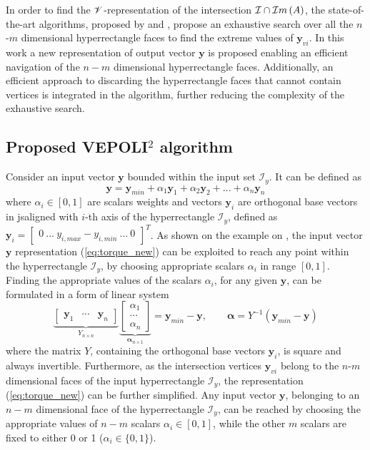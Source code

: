 In order to find the  $\mathscr{V}$-representation of the intersection  $\mathcal{I}\cap \mathcal{I}m\left(A\right)$, the state-of-the-art algorithms, proposed by \citet{chiacchio_evaluation_1996} and \citet{sasaki2011vertex}, propose an exhaustive search over all the $n$-$m$ dimensional hyperrectangle faces to find the extreme values of $\bm{y}_{vi}$. In this work a new representation of output vector $\bm{y}$ is proposed enabling an efficient navigation of the $n-m$ dimensional hyperrectangle faces. Additionally, an efficient approach to discarding the hyperrectangle faces that cannot contain vertices is integrated in the algorithm, further reducing the complexity of the exhaustive search.

\subsection{Proposed VEPOLI$^2$ algorithm}
Consider an input vector $\bm{y}$ bounded within the input set $\mathcal{I}_y$. It can be defined as
\begin{equation}
    \bm{y} = {\bm{y}}_{min} + \alpha_1 \bm{y}_1+ \alpha_2 \bm{y}_2 + ... + \alpha_n \bm{y}_n
    \label{eq:torque_new}
\end{equation}
where $\alpha_i \in [0,1]$ are scalars weights and vectors $\bm{y}_i$ are orthogonal base vectors in \gls{js}aligned with $i$-th axis of the hyperrectangle $\mathcal{I}_y$, defined as $\bm{y}_i = \begin{bmatrix} 0~\ldots~y_{i,max} - y_{i,min}~\ldots~0 \end{bmatrix}^T$. As shown on the example on , the input vector $\bm{y}$ representation (\ref{eq:torque_new}) can be exploited to reach any point within the hyperrectangle $\mathcal{I}_y$, by choosing appropriate scalars $\alpha_i$ in range $[0,1]$. Finding the appropriate values of the scalars $\alpha_i$, for any given $\bm{y}$, can be formulated in a form of linear system
\begin{equation}
\underbrace{\begin{bmatrix}
    \bm{y}_1&\cdots&\bm{y}_n
\end{bmatrix}}_{Y_{n\times n}}\underbrace{\begin{bmatrix}
    \alpha_1\\
    \cdots\\
    \alpha_n
\end{bmatrix}}_{\bm{\alpha}_{n\times 1}} = \bm{y}_{min} - \bm{y}, \qquad  \bm{\alpha} = Y^{-1}(\bm{y}_{min} - \bm{y})
\label{eq:define_Y_Alpha}
\end{equation}
where the matrix $Y$, containing the orthogonal base vectors $\bm{y}_i$, is square and always invertible. 
Furthermore, as the intersection vertices $\bm{y}_{vi}$ belong to the $n$-$m$ dimensional faces of the input hyperrectangle $\mathcal{I}_y$, the representation (\ref{eq:torque_new}) can be further simplified. Any input vector $\bm{y}$, belonging to an $n-m$ dimensional face of the hyperrectangle $\mathcal{I}_y$, can be reached by choosing the appropriate values of $n-m$ scalars $\alpha_i\in[0,1]$, while the other $m$ scalars are fixed to either 0 or 1 ($\alpha_i\in\{0,1\}$).


